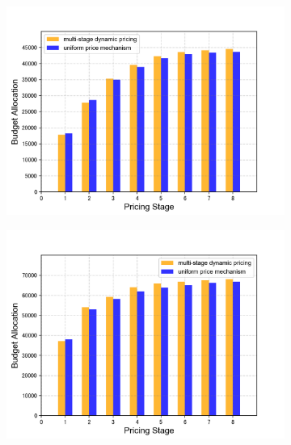 \documentclass[sigconf,authordraft]{acmart}
\begin{document}
\begin{figure}[tb]
    \centering
    \begin{subfigure}[b]{0.2\textwidth}
    \includegraphics[width=\textwidth]{m-pricing2-a.png}
  
    \end{subfigure}
    \quad
    \begin{subfigure}[b]{0.2\textwidth}
    \includegraphics[width=\textwidth]{m-pricing2-b.png}
    \end{subfigure}
    

\end{figure}
\end{document}
